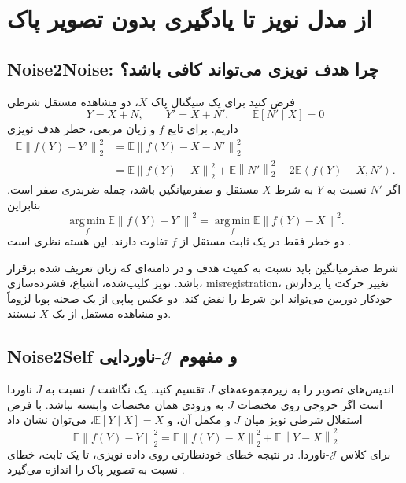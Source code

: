 \documentclass[12pt,openany,oneside]{book}
\newcommand{\E}{\mathbb{E}}
\newcommand{\norm}[1]{\left\lVert #1\right\rVert}
\newcommand{\inner}[2]{\left\langle #1,#2\right\rangle}
\newcommand{\argmin}{\operatorname*{arg\,min}}
\begin{document}
\section{از مدل نویز تا یادگیری بدون تصویر پاک}

\subsection{Noise2Noise: چرا هدف نویزی می‌تواند کافی باشد؟}

فرض کنید برای یک سیگنال پاک \(X\)، دو مشاهده مستقل شرطی
\begin{equation}
Y=X+N,
\qquad
Y'=X+N',
\qquad
\E[N'\mid X]=0
\end{equation}
داریم. برای تابع \(f\) و زیان مربعی، خطر هدف نویزی
\begin{align}
\E\norm{f(Y)-Y'}_2^2
&=\E\norm{f(Y)-X-N'}_2^2\\
&=\E\norm{f(Y)-X}_2^2+\E\norm{N'}_2^2
-2\E\inner{f(Y)-X}{N'}.
\end{align}
اگر \(N'\) نسبت به \(Y\) به شرط \(X\) مستقل و صفرمیانگین باشد، جمله ضربدری صفر است. بنابراین
\begin{equation}
\argmin_f\E\norm{f(Y)-Y'}^2
=
\argmin_f\E\norm{f(Y)-X}^2.
\label{eq:n2n}
\end{equation}
دو خطر فقط در یک ثابت مستقل از \(f\) تفاوت دارند. این هسته نظری  است
\cite{lehtinen2018noise2noise}.

\begin{warningbox}
شرط صفرمیانگین باید نسبت به کمیت هدف و در دامنه‌ای که زیان تعریف شده برقرار باشد. نویز کلیپ‌شده، اشباع،
فشرده‌سازی، misregistration، تغییر حرکت یا پردازش خودکار دوربین می‌تواند این شرط را نقض کند. دو عکس پیاپی
از یک صحنه پویا لزوماً دو مشاهده مستقل از یک \(X\) نیستند.
\end{warningbox}

\subsection{Noise2Self و مفهوم \(\mathcal J\)-ناوردایی}

اندیس‌های تصویر را به زیرمجموعه‌های \(J\) تقسیم کنید. یک نگاشت \(f\) نسبت به \(J\) ناوردا است اگر خروجی روی
مختصات \(J\) به ورودی همان مختصات وابسته نباشد. با فرض استقلال شرطی نویز میان \(J\) و مکمل آن، و
\(\E[Y\mid X]=X\)، می‌توان نشان داد
\begin{equation}
\E\norm{f(Y)-Y}_2^2
=
\E\norm{f(Y)-X}_2^2+\E\norm{Y-X}_2^2
\end{equation}
برای کلاس \(\mathcal J\)-ناوردا. در نتیجه خطای خودنظارتی روی داده نویزی، تا یک ثابت، خطای نسبت به تصویر پاک را
اندازه می‌گیرد \cite{batson2019noise2self}.
\end{document}

